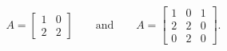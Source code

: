 \[A=\begin{bmatrix}1&0\\ 2&2\end{bmatrix}\qquad\text{and}\qquad A=\begin{bmatrix}1&0&1\\ 2&2&0\\ 0&2&0\end{bmatrix}.\]